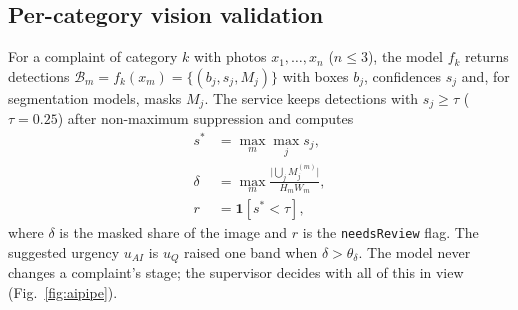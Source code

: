 \documentclass[conference]{IEEEtran}
\begin{document}
\subsection{Per-category vision validation}\label{sec:ai}
For a complaint of category $k$ with photos $x_1,\dots,x_n$ ($n\le3$), the model $f_k$ returns detections $\mathcal{B}_m=f_k(x_m)=\{(b_j,s_j,M_j)\}$ with boxes $b_j$, confidences $s_j$ and, for segmentation models, masks $M_j$. The service keeps detections with $s_j\ge\tau$ ($\tau=0.25$) after non-maximum suppression and computes
\begin{align}
s^{*}&=\max_{m}\max_{j} s_j, \label{eq:smax}\\
\delta&=\max_{m}\frac{\bigl|\bigcup_j M_j^{(m)}\bigr|}{H_m W_m}, \label{eq:delta}\\
r&=\mathbf{1}\left[s^{*}<\tau\right], \label{eq:review}
\end{align}
where $\delta$ is the masked share of the image and $r$ is the \texttt{needsReview} flag. The suggested urgency $u_{AI}$ is $u_Q$ raised one band when $\delta>\theta_\delta$. The model never changes a complaint's stage; the supervisor decides with all of this in view (Fig.~\ref{fig:aipipe}).
\end{document}
